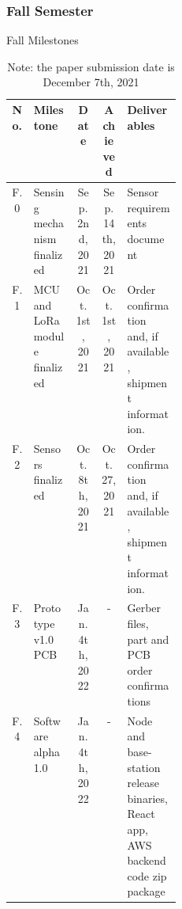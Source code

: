 \subsubsection{Fall Semester}
\begin{table}[H]
    \footnotesize  
    \caption{Fall Milestones}

    \begin{tabularx}{\linewidth}{| c | p{0.25\linewidth} | c | c | X |}
      \hline
      No. & Milestone & Date & Achieved & Deliverables 
      \\\hline\hline

      F.0 
      & Sensing mechanism finalized 
      & Sep. 2nd, 2021 
      & Sep. 14th, 2021
      & Sensor requirements document 
      \\\hline

      F.1 
      & MCU and LoRa module finalized
      & Oct. 1st, 2021 
      & Oct. 1st, 2021 
      & Order confirmation and, if available, shipment information. 
      \\\hline

      F.2 
      & Sensors finalized 
      & Oct. 8th, 2021 
      & Oct. 27, 2021
      & Order confirmation and, if available, shipment information. 
      \\\hline

      F.3 
      & Prototype v1.0 PCB 
      & Jan. 4th, 2022 
      & -
      & Gerber files, part and PCB order confirmations
      \\\hline

      F.4 
      & Software alpha 1.0 
      & Jan. 4th, 2022 
      & -
      & Node and base-station release binaries, React app, AWS backend code zip package 
      \\\hline

    \end{tabularx}
    \caption*{\footnotesize Note: the paper submission date is December 7th, 2021}
    \label{tab:fall-milestones}
\end{table}


